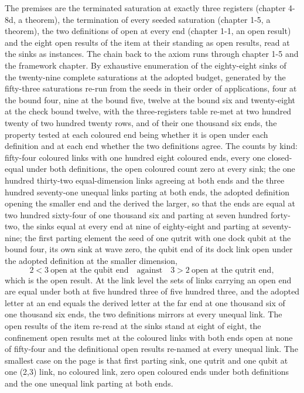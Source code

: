 \begin{chproof}[census]
The premises are the terminated saturation at exactly three registers (chapter 4-8d, a theorem), the termination of every seeded saturation (chapter 1-5, a theorem), the two definitions of open at every end (chapter 1-1, an open result) and the eight open results of the item at their standing as open results, read at the sinks as instances. The chain back to the axiom runs through chapter 1-5 and the framework chapter. By exhaustive enumeration of the eighty-eight sinks of the twenty-nine complete saturations at the adopted budget, generated by the fifty-three saturations re-run from the seeds in their order of applications, four at the bound four, nine at the bound five, twelve at the bound six and twenty-eight at the check bound twelve, with the three-registers table re-met at two hundred twenty of two hundred twenty rows, and of their one thousand six ends, the property tested at each coloured end being whether it is open under each definition and at each end whether the two definitions agree. The counts by kind: fifty-four coloured links with one hundred eight coloured ends, every one closed-equal under both definitions, the open coloured count zero at every sink; the one hundred thirty-two equal-dimension links agreeing at both ends and the three hundred seventy-one unequal links parting at both ends, the adopted definition opening the smaller end and the derived the larger, so that the ends are equal at two hundred sixty-four of one thousand six and parting at seven hundred forty-two, the sinks equal at every end at nine of eighty-eight and parting at seventy-nine; the first parting element the seed of one qutrit with one dock qubit at the bound four, its own sink at wave zero, the qubit end of its dock link open under the adopted definition at the smaller dimension,
\begin{equation}
2 < 3 \ \text{open at the qubit end} \quad\text{against}\quad 3 > 2 \ \text{open at the qutrit end} ,
\end{equation}
which is the open result. At the link level the sets of links carrying an open end are equal under both at five hundred three of five hundred three, and the adopted letter at an end equals the derived letter at the far end at one thousand six of one thousand six ends, the two definitions mirrors at every unequal link. The open results of the item re-read at the sinks stand at eight of eight, the confinement open results met at the coloured links with both ends open at none of fifty-four and the definitional open results re-named at every unequal link. The smallest case on the page is that first parting sink, one qutrit and one qubit at one (2,3) link, no coloured link, zero open coloured ends under both definitions and the one unequal link parting at both ends.


\end{chproof}
